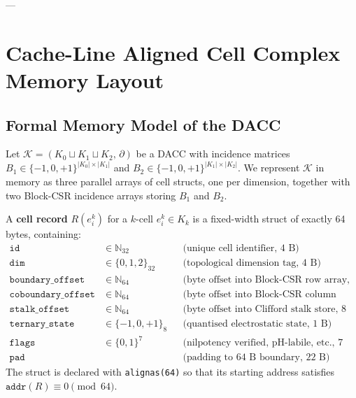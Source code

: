---

\section{Cache-Line Aligned Cell Complex Memory Layout}
\label{sec:cacheline}

\subsection{Formal Memory Model of the DACC}
\label{subsec:formal_memory}

Let $\mathcal{K} = (K_0 \sqcup K_1 \sqcup K_2,\, \partial)$ be a DACC with
incidence matrices $B_1 \in \{-1,0,+1\}^{|K_0|\times|K_1|}$ and
$B_2 \in \{-1,0,+1\}^{|K_1|\times|K_2|}$.  We represent $\mathcal{K}$ in
memory as three parallel arrays of cell structs, one per dimension,
together with two Block-CSR incidence arrays storing $B_1$ and $B_2$.

\begin{definition}
\label{def:cell_record}
A \textbf{cell record} $R(e_i^k)$ for a $k$-cell $e_i^k \in K_k$ is a
fixed-width struct of exactly 64\,bytes, containing:
\begin{align*}
    \texttt{id}                &\in \mathbb{N}_{32}  &&\text{(unique cell identifier, 4 B)} \\
    \texttt{dim}               &\in \{0,1,2\}_{32}   &&\text{(topological dimension tag, 4 B)} \\
    \texttt{boundary\_offset}  &\in \mathbb{N}_{64}  &&\text{(byte offset into Block-CSR row array, 8 B)} \\
    \texttt{coboundary\_offset}&\in \mathbb{N}_{64}  &&\text{(byte offset into Block-CSR column array, 8 B)} \\
    \texttt{stalk\_offset}     &\in \mathbb{N}_{64}  &&\text{(byte offset into Clifford stalk store, 8 B)} \\
    \texttt{ternary\_state}    &\in \{-1,0,+1\}_{8}  &&\text{(quantised electrostatic state, 1 B)} \\
    \texttt{flags}             &\in \{0,1\}^{7}      &&\text{(nilpotency verified, pH-labile, etc., 7 B)} \\
    \texttt{pad}               &                     &&\text{(padding to 64 B boundary, 22 B)}
\end{align*}
The struct is declared with \texttt{alignas(64)} so that its starting
address satisfies $\texttt{addr}(R) \equiv 0 \pmod{64}$.
\end{definition}


